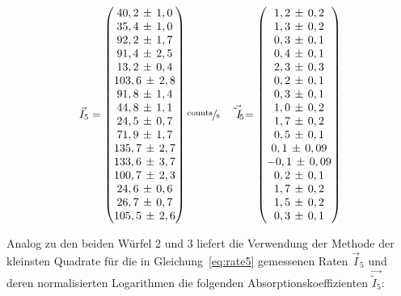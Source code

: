 \begin{equation}
	\vec{I}_5=
	\begin{pmatrix}
		40,2\,\pm\,1,0 \\
		35,4\,\pm\,1,0 \\
		92,2\,\pm\,1,7 \\
		91,4\,\pm\,2,5 \\
		13,2\,\pm\,0,4 \\
    103,6\,\pm\,2,8 \\
		91,8\,\pm\,1,4 \\
		44,8\,\pm\,1,1 \\
		24,5\,\pm\,0,7 \\
		71,9\,\pm\,1,7 \\
		135,7\,\pm\,2,7 \\
    133,6\,\pm\,3,7 \\
		100,7\,\pm\,2,3 \\
		24,6\,\pm\,0,6 \\
		26,7\,\pm\,0,7 \\
		105,5\,\pm\,2,6
	\end{pmatrix}
	\sfrac{\text{counts}}{\text{s}}\quad
	\vec{\tilde{I}_5}=
	\begin{pmatrix}
    1,2\,\pm\,0,2 \\
		1,3\,\pm\,0,2 \\
		0,3\,\pm\,0,1 \\
		0,4\,\pm\,0,1 \\
		2,3\,\pm\,0,3 \\
    0,2\,\pm\,0,1 \\
		0,3\,\pm\,0,1 \\
		1,0\,\pm\,0,2 \\
		1,7\,\pm\,0,2 \\
		0,5\,\pm\,0,1 \\
		0,1\,\pm\,0,09 \\
    -0,1\,\pm\,0,09 \\
		0,2\,\pm\,0,1 \\
		1,7\,\pm\,0,2 \\
		1,5\,\pm\,0,2 \\
		0,3\,\pm\,0,1
	\end{pmatrix}
	\label{eq:rate5}
\end{equation}

Analog zu den beiden Würfel 2 und 3 liefert die Verwendung der Methode der kleinsten Quadrate für die in
Gleichung~\eqref{eq:rate5} gemessenen Raten $\vec{I}_5$ und deren normalisierten Logarithmen
die folgenden Absorptionskoeffizienten $\vec{\tilde{I}_5}$:

